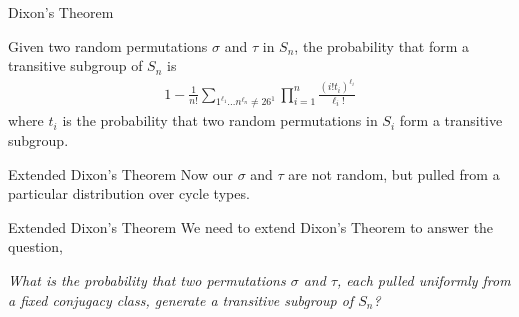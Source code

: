 \documentclass[hyphens,aspectratio=169]{beamer}
\begin{document}
\begin{frame}[fragile]{Dixon's Theorem}
	\begin{theorem}
		Given two random permutations $\sigma$ and $\tau$ in $S_n$, the
		probability that form a transitive subgroup of $S_n$ is
		\begin{align*}
			1-\frac{1}{n!}\sum_{1^{\ell_1}\dots n^{\ell_n} \ne 26^1}\prod_{i=1}^n{\frac{(i!t_{i})^{\ell_i}}{\ell_i!}}
		\end{align*}
		where $t_i$ is the probability that two random permutations in
		$S_i$ form a transitive subgroup.
	\end{theorem}

\end{frame}

\begin{frame}[fragile]{Extended Dixon's Theorem}
	\large
	Now our $\sigma$ and $\tau$ are not random, but pulled from a particular distribution over cycle types.
\end{frame}

\begin{frame}[fragile]{Extended Dixon's Theorem}
	We need to extend Dixon's Theorem to answer the question,
	\\\begin{center}
		\emph{What is the probability that two permutations $\sigma$ and $\tau$, each pulled uniformly from a fixed conjugacy class, generate a transitive subgroup of $S_n$?}
	\end{center}
\end{frame}
\end{document}
